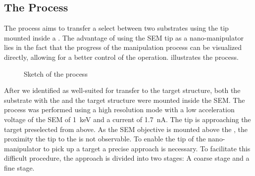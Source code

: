 	\subsection{The \PP Process}

			The \pp process aims to transfer a select \nd between two substrates using the tip mounted inside a \sem. The advantage of using the SEM tip as a nano-manipulator lies in the fact that the progress of the manipulation process can be visualized directly, allowing for a better control of the operation.  illustrates the process.

			\begin{figure}[htp]
				\centering
				\caption{Sketch of the \pp process}
				\label{fig::pp_sketch}
			\end{figure}

	After we identified \nds as well-suited for transfer to the target structure, both the substrate with the \nds and the target structure were mounted inside the SEM.
	The process was performed using a high resolution mode with a low acceleration voltage of the SEM of \SI{1}{\kilo\electronvolt} and a current of \SI{1.7}{\nano\ampere}.
	The tip is approaching the target preselected \nd from above.
	As the SEM objective is mounted above the \np, the proximity the \np tip  to the \nd is not observable.
	To enable the tip of the nano-manipulator to pick up a target \nd a precise approach is necessary. To facilitate this difficult procedure, the approach is divided into two stages: A coarse stage and a fine stage.

